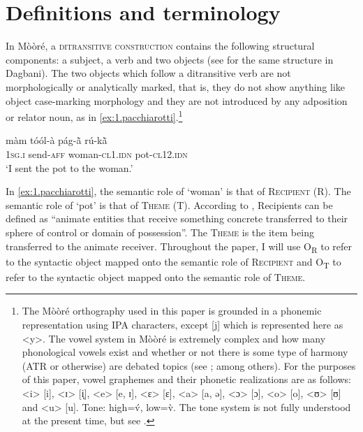 \documentclass[output=paper]{langsci/langscibook}
\begin{document}
\section{Definitions and terminology}\label{§2:definitions.pacchiarotti}

In Mòòré, a \textsc{ditransitive construction} contains the following structural components: a subject, a verb and two objects (see \citealt{olawsky1999} for the same structure in Dagbani). The two objects which follow a ditransitive verb are not morphologically or analytically marked, that is, they do not show anything like object case-marking morphology and they are not introduced by any adposition or relator noun, as in \ref{ex:1.pacchiarotti}.\footnote{The Mòòré orthography used in this paper is grounded in a phonemic representation using IPA characters, except [j] which is represented here as {\textless}y{\textgreater}. The vowel system in Mòòré is extremely complex and how many phonological vowels exist and whether or not there is some type of harmony (ATR or otherwise) are debated topics (see \citealt{peterson1971,canu1974,rennison1990,nikiema2000,calamaibertinetto2005}; among others). For the purposes of this paper, vowel graphemes and their phonetic realizations are as follows: {\textless}i{\textgreater} [i], {\textless}ɪ{\textgreater} [i̙], {\textless}e{\textgreater} [e, ɪ], {\textless}ɛ{\textgreater} [ɛ], {\textless}a{\textgreater} [a, ə], {\textless}ɔ{\textgreater} [ɔ], {\textless}o{\textgreater} [o], {\textless}ʊ{\textgreater} [ʊ] and {\textless}u{\textgreater} [u]. Tone: high=\'{v}, low=\`{v}. The tone system is not fully understood at the present time, but see \citet{peterson1971}.}

\ea
\label{ex:1.pacchiarotti}
\gll m\`{a}m    t\'{o}\'{o}l-\`{a}        p\'{a}g-\`{\~{a}}             r\'{u}-k\`{\~{a}}\\
\textsc{1sg.i}    send-\textsc{aff}      woman-\textsc{cl1.idn}       pot-\textsc{cl12.idn} \\
\glt `I sent the pot to the woman.'  
\z

In \ref{ex:1.pacchiarotti}, the semantic role of `woman' is that of \textsc{Recipient} (R).  The semantic role of `pot' is that of \textsc{Theme} (T). According to \citet[274]{kittila2005}, Recipients can be defined as ``animate entities that receive something concrete transferred to their sphere of control or domain of possession''. The \textsc{Theme} is the item being transferred to the animate receiver. Throughout the paper, I will use O\textsubscript{R} to refer to the syntactic object mapped onto the semantic role of \textsc{Recipient} and O\textsubscript{T} to refer to the syntactic object mapped onto the semantic role of \textsc{Theme}. 
\end{document}
